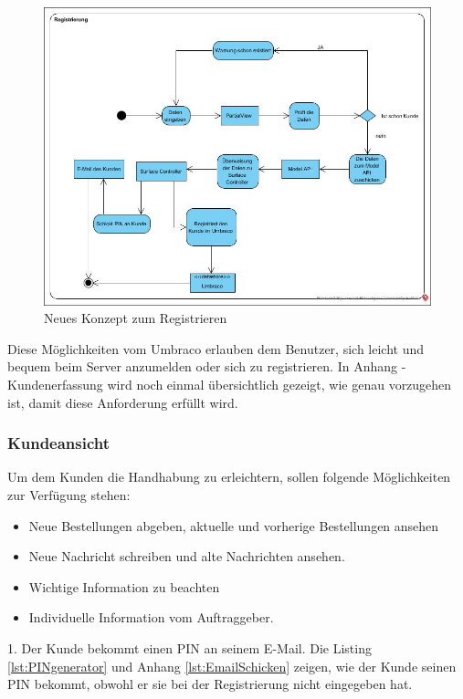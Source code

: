 \begin{figure}[h]
	\centering
	\includegraphics[width=1\linewidth]{Graphics/Registrierung.JPG}
	\caption[neues Konzept: Registrierung]{Neues Konzept zum Registrieren}
	\label{fig:Registrierung}
\end{figure}

Diese Möglichkeiten vom Umbraco erlauben dem Benutzer, sich leicht und bequem beim Server anzumelden oder sich zu registrieren. In Anhang - Kundenerfassung wird noch einmal übersichtlich gezeigt, wie genau vorzugehen ist, damit diese Anforderung erfüllt wird.


\subsubsection{Kundeansicht}

Um dem Kunden die Handhabung zu erleichtern, sollen folgende Möglichkeiten zur Verfügung stehen:

\begin{itemize}	
	\item Neue Bestellungen abgeben, aktuelle und vorherige Bestellungen ansehen
	\item Neue Nachricht schreiben und alte Nachrichten ansehen.
	\item Wichtige Information zu beachten
	\item Individuelle Information vom Auftraggeber.
\end{itemize}
1. Der Kunde bekommt einen PIN an seinem E-Mail. Die Listing \ref{lst:PINgenerator} und Anhang \ref{lst:EmailSchicken} zeigen, wie der Kunde seinen PIN bekommt, obwohl er sie bei der Registrierung nicht eingegeben hat.

